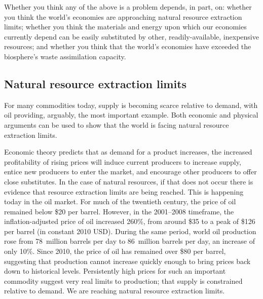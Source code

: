 Whether you think any of the above is a problem depends, in part, on:
whether you think the world's economies are approaching 
	natural resource extraction limits;
whether you think the materials and energy upon which our economies currently depend
	can be easily substituted by other, readily-available, inexpensive resources; and
whether you think that the world's economies have exceeded 
	the biosphere's waste assimilation capacity.


\subsection{Natural resource extraction limits}
\label{sub:natural_resource_extraction_limits}

For many commodities today, 
supply is becoming scarce relative to demand, 
with oil providing, arguably, the most important example. 
Both economic and physical arguments can be used to show that the world is facing
natural resource extraction limits.

Economic theory predicts that as demand for a product increases,
the increased profitability of rising prices 
will induce current producers to increase supply, 
entice new producers to enter the market,
and encourage other producers to offer close substitutes. 
In the case of natural resources, if that does not occur
there is evidence that resource extraction limits are being reached.
This is happening today in the oil market.
For much of the twentieth century, the price of oil remained below \$20 per barrel.
However, in the 2001--2008 timeframe,
the inflation-adjusted price of oil increased 260\%,
from around \$35 to a peak of \$126 per barrel 
(in constant 2010 USD).
During the same period,
world oil production rose from 
78~million barrels per day to 86~million barrels per day,
an increase of only 10\%.\cite{EIA2014}
Since 2010, the price of oil has remained over \$80 per barrel,
suggesting that production cannot increase quickly enough to bring prices
back down to historical levels.
Persistently high prices for such an important commodity
suggest very real limits to production; 
that supply is constrained relative to demand. 
We are reaching natural resource extraction limits.

